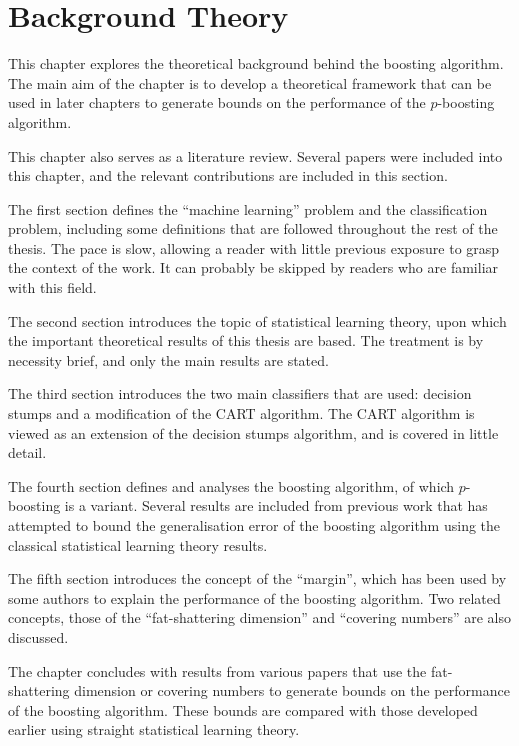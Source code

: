 

\chapter{Background Theory}

This chapter explores the theoretical background behind the
boosting algorithm.  The main aim of the chapter is to develop a
theoretical framework that can be used in later chapters to generate
bounds on the performance of the $p$-boosting algorithm.

This chapter also serves as a literature review.  Several papers were
included into this chapter, and the relevant contributions are
included in this section.

The first section defines the ``machine learning'' problem and
the classification problem, including some definitions that are
followed throughout the rest of the thesis.  The pace is slow,
allowing a reader with little previous exposure to grasp the context
of the work.  It can probably be skipped by readers who are familiar
with this field.

The second section introduces the topic of statistical learning theory,
upon which the important theoretical results of this thesis are based.
The treatment is by necessity brief, and only the main results are
stated.

The third section introduces the two main classifiers that are used:
decision stumps and a modification of the CART algorithm.  The CART
algorithm is viewed as an extension of the decision stumps algorithm,
and is covered in little detail.

The fourth section defines and analyses the boosting algorithm, of
which $p$-boosting is a variant.  Several results are included from
previous work that has attempted to bound the generalisation error of
the boosting algorithm using the classical statistical learning theory
results.

The fifth section introduces the concept of the ``margin'', which has
been used by some authors to explain the performance of the boosting
algorithm.  Two related concepts, those of the ``fat-shattering
dimension'' and ``covering numbers'' are also discussed.

The chapter concludes with results from various papers that use the
fat-shattering dimension or covering numbers to generate bounds on the
performance of the boosting algorithm.  These bounds are compared with
those developed earlier using straight statistical learning theory.




